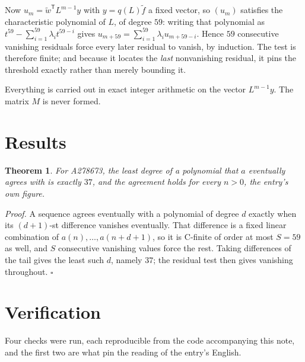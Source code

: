 \documentclass[11pt]{article}
\newtheorem{theorem}{Theorem}
\theoremstyle{definition}
\begin{document}
Now $u_m = \tilde w^{\mathsf T} L^{m-1} y$ with $y = q(L)\tilde f$ a fixed vector, so $(u_m)$ satisfies the characteristic polynomial of $L$, of degree $59$: writing that polynomial as $t^{59} - \sum_{i=1}^{59} \lambda_i t^{59-i}$ gives $u_{m+59} = \sum_{i=1}^{59} \lambda_i u_{m+59-i}$. Hence $59$ consecutive vanishing residuals force every later residual to vanish, by induction. The test is therefore finite; and because it locates the {\itshape last} nonvanishing residual, it pins the threshold exactly rather than merely bounding it.

Everything is carried out in exact integer arithmetic on the vector $L^{m-1}y$. The matrix $M$ is never formed.

\section{Results}

\begin{theorem} For A278673, the least degree of a polynomial that $a$ eventually agrees with is exactly $37$, and the agreement holds for every $n > 0$, the entry's own figure.\end{theorem}

{\itshape Proof.} A sequence agrees eventually with a polynomial of degree $d$ exactly when its $(d+1)$-st difference vanishes eventually. That difference is a fixed linear combination of $a(n),\dots,a(n+d+1)$, so it is C-finite of order at most $S = 59$ as well, and $S$ consecutive vanishing values force the rest. Taking differences of the tail gives the least such $d$, namely $37$; the residual test then gives vanishing throughout. $\square$

\section{Verification}

Four checks were run, each reproducible from the code accompanying this note, and the first two are what pin the reading of the entry's English.
\end{document}
